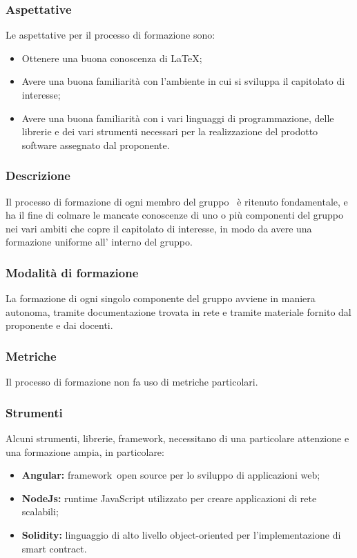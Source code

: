         \subsubsection {Aspettative}
        Le aspettative per il processo di formazione sono:
        \begin {itemize}
          \item Ottenere una buona conoscenza di \LaTeX;
          \item Avere una buona familiarità con l'ambiente in cui si sviluppa il capitolato di interesse;
          \item Avere una buona familiarità con i vari linguaggi di programmazione, delle librerie e dei vari strumenti necessari per la realizzazione del prodotto software assegnato dal proponente.
        \end {itemize}
        \subsubsection {Descrizione}
        Il processo di formazione di ogni membro del gruppo \groupName\ è ritenuto fondamentale, e ha il fine di colmare le mancate conoscenze di uno o più componenti del gruppo nei vari ambiti che copre il capitolato di interesse, in modo da avere una formazione uniforme all' interno del gruppo.
        \subsubsection {Modalità di formazione}
        La formazione di ogni singolo componente del gruppo avviene in maniera autonoma, tramite documentazione trovata in rete e tramite materiale fornito dal proponente e dai docenti.
        \subsubsection {Metriche}
        Il processo di formazione non fa uso di metriche particolari.
        \subsubsection {Strumenti}
        Alcuni strumenti, librerie, framework\glo, necessitano di una particolare attenzione e una formazione ampia, in particolare:
        \begin {itemize}
          \item \textbf{Angular:} framework\glo\ open source per lo sviluppo di applicazioni web;
          \item \textbf{NodeJs: } runtime JavaScript utilizzato per creare applicazioni di rete scalabili;
          \item \textbf{Solidity: } linguaggio di alto livello object-oriented per l'implementazione di smart contract\glo.
        \end {itemize}